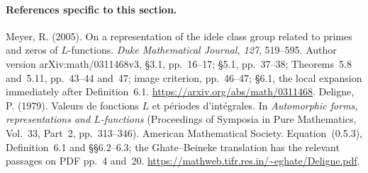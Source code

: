 \paragraph{References specific to this section.}
Meyer, R. (2005). On a representation of the idele class
group related to primes and zeros of $L$-functions.
\emph{Duke Mathematical Journal, 127}, 519--595.
Author version arXiv:math/0311468v3, \S3.1, pp.~16--17;
\S5.1, pp.~37--38; Theorems~5.8 and~5.11, pp.~43--44
and~47; image criterion, pp.~46--47; \S6.1, the local
expansion immediately after Definition~6.1.
\url{https://arxiv.org/abs/math/0311468}.
Deligne, P. (1979). Valeurs de fonctions $L$ et p\'eriodes
d'int\'egrales. In \emph{Automorphic forms, representations
and $L$-functions} (Proceedings of Symposia in Pure
Mathematics, Vol.~33, Part~2, pp.~313--346).
American Mathematical Society. Equation~(0.5.3),
Definition~6.1 and \S\S6.2--6.3; the Ghate--Beineke
translation has the relevant passages on PDF pp.~4 and~20.
\url{https://mathweb.tifr.res.in/~eghate/Deligne.pdf}.
